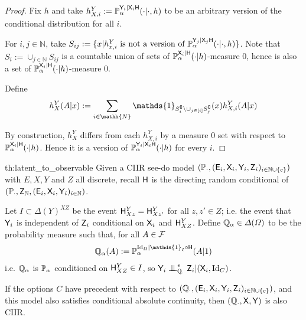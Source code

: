\begin{proof}
Fix $h$ and take $h^Y_{X,i}:=\mathbb{P}_\alpha^{\mathsf{Y}_i|\mathsf{X}_i\mathsf{H}}(\cdot|\cdot,h)$ to be an arbitrary version of the conditional distribution for all $i$.

For $i,j\in \mathbb{N}$, take $S_{ij} := \{x|h^Y_{x,i}\text{ is not a version of }\mathbb{P}_\alpha^{\mathsf{Y}_j|\mathsf{X}_j\mathsf{H}}(\cdot|\cdot,h)\}$. Note that $S_i:= \cup_{j\in \mathbb{N}} S_{ij}$ is a countable union of sets of $\mathbb{P}_\alpha^{\mathsf{X}_i|\mathsf{H}}(\cdot|h)$-measure 0, hence is also a set of $\mathbb{P}_\alpha^{\mathsf{X}_i|\mathsf{H}}(\cdot|h)$-measure 0.

Define
\begin{align}
    h^Y_X(A|x) := \sum_{i\in \mathh{N}} \mathds{1}_{S_i^\complement\setminus \cup_{j\in[i]}S_j^\complement}(x) h^Y_{X,i}(A|x)
\end{align}

By construction, $h^Y_X$ differs from each $h^Y_{X,i}$ by a measure 0 set with respect to $\mathbb{P}_\alpha^{\mathsf{X}_i|\mathsf{H}}(\cdot|h)$. Hence it is a version of $\mathbb{P}_\alpha^{\mathsf{Y}_i|\mathsf{X}_i\mathsf{H}}(\cdot|h)$ for every $i$.
\end{proof}

\begin{reptheorem}{th:latent_to_observable}
Given a CIIR see-do model $(\mathbb{P}_\cdot,(\mathsf{E}_i,\mathsf{X}_i,\mathsf{Y}_i,\mathsf{Z}_i)_{i\in\mathbb{N}\cup\{c\}})$ with $E,X,Y$ and $Z$ all discrete, recall $\mathsf{H}$ is the directing random conditional of $(\mathbb{P}_\cdot,\mathsf{Z}_{\mathbb{N}},(\mathsf{E}_i,\mathsf{X}_i,\mathsf{Y}_i)_{i\in \mathbb{N}})$.

Let $I\subset \Delta(Y)^{XZ}$ be the event $\mathsf{H}^Y_{Xz}=\mathsf{H}^Y_{Xz'}$ for all $z,z'\in Z$; i.e. the event that $\mathsf{Y}_i$ is independent of $\mathsf{Z}_i$ conditional on $\mathsf{X}_i$ and $\mathsf{H}^Y_{XZ}$. Define $\mathbb{Q}_\alpha\in \Delta(\Omega)$ to be the probability measure such that, for all $A\in \mathcal{F}$
\begin{align}
\prob{Q}_\alpha(A) := \prob{P}_\alpha^{\mathrm{Id}_\Omega|\mathds{1}_I\circ \RV{H}}(A|1)
\end{align}
i.e. $\mathbb{Q}_\alpha$ is $\mathbb{P}_\alpha$ conditioned on $\mathsf{H}^Y_{XZ}\in I$, so $\RV{Y}_i\CI^e_{\prob{Q}_\cdot} \RV{Z}_i|(\RV{X}_i,\mathrm{Id}_C)$.

If the options $C$ have precedent with respect to $(\mathbb{Q}_\cdot,(\mathsf{E}_i,\mathsf{X}_i,\mathsf{Y}_i,\mathsf{Z}_i)_{i\in\mathbb{N}\cup\{c\}})$, and this model also satisfies conditional absolute continuity, then $(\mathbb{Q}_\cdot,\mathsf{X},\mathsf{Y})$ is also CIIR.
\end{reptheorem}

